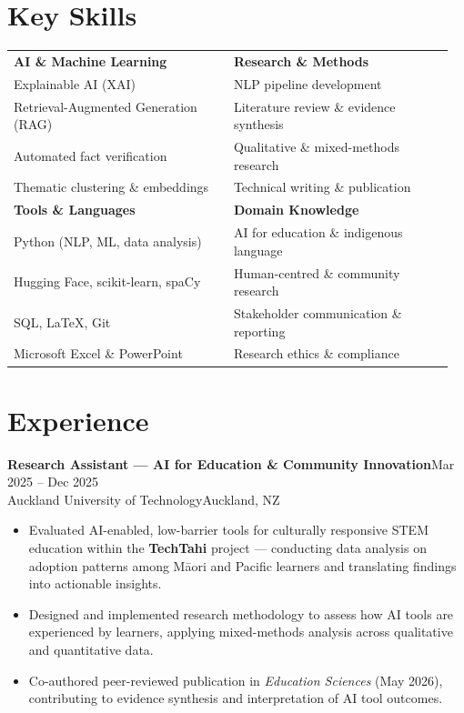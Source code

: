 \documentclass[10.5pt,a4paper]{article}
\newcommand{\tabitem}{{\color{accent!70}\textbullet}\enspace}
\newenvironment{expbox}{%
  \begin{tcolorbox}[
    blanker, breakable,
    left=10pt,
    borderline west={2.5pt}{0pt}{accentlt},
    before upper={\parskip=2pt},
    top=0pt, bottom=0pt
  ]
}{%
  \end{tcolorbox}\vspace{4pt}
}
\newcommand{\role}[4]{%
  {\bfseries #1}\hfill{\small\color{accent}#2}\\[-1pt]
  {\small\color{mid}#3}\hfill{\small\color{light}#4}\\[3pt]%
}
\begin{document}
\section{Key Skills}

\renewcommand{\arraystretch}{1.35}
\begin{tabular}{@{}p{0.48\linewidth}p{0.48\linewidth}@{}}
  \textbf{\color{mid}AI \& Machine Learning}
    & \textbf{\color{mid}Research \& Methods} \\
  \tabitem Explainable AI (XAI)
    & \tabitem NLP pipeline development \\
  \tabitem Retrieval-Augmented Generation (RAG)
    & \tabitem Literature review \& evidence synthesis \\
  \tabitem Automated fact verification
    & \tabitem Qualitative \& mixed-methods research \\
  \tabitem Thematic clustering \& embeddings
    & \tabitem Technical writing \& publication \\[20pt]
  \textbf{\color{mid}Tools \& Languages}
    & \textbf{\color{mid}Domain Knowledge} \\
  \tabitem Python (NLP, ML, data analysis)
    & \tabitem AI for education \& indigenous language \\
  \tabitem Hugging Face, scikit-learn, spaCy
    & \tabitem Human-centred \& community research \\
  \tabitem SQL, LaTeX, Git
    & \tabitem Stakeholder communication \& reporting \\
  \tabitem Microsoft Excel \& PowerPoint
    & \tabitem Research ethics \& compliance \\
\end{tabular}
\renewcommand{\arraystretch}{1}

\section{Experience}

\begin{expbox}
\role{Research Assistant — AI for Education \& Community Innovation}
     {Mar 2025 – Dec 2025}
     {Auckland University of Technology}
     {Auckland, NZ}
\begin{itemize}
  \item Evaluated AI-enabled, low-barrier tools for culturally responsive STEM education
        within the \textbf{TechTahi} project — conducting data analysis on adoption patterns
        among Māori and Pacific learners and translating findings into actionable insights.
  \item Designed and implemented research methodology to assess how AI tools are experienced
        by learners, applying mixed-methods analysis across qualitative and quantitative data.
  \item Co-authored peer-reviewed publication in \textit{Education Sciences} (May 2026),
        contributing to evidence synthesis and interpretation of AI tool outcomes.
\end{itemize}
\end{expbox}
\end{document}
